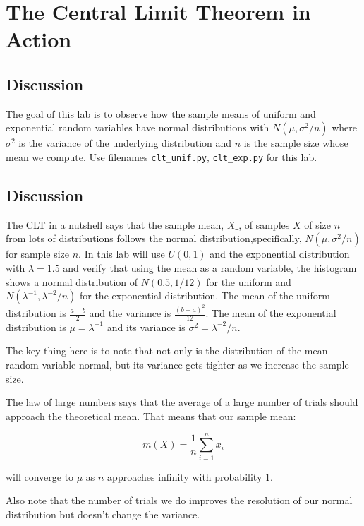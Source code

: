 \chapter{The Central Limit Theorem in Action}

\setcounter{problem}{1}

\section{Discussion}

\begin{fullwidth}

The goal of this lab is to observe how the sample means of uniform and exponential random variables have normal distributions with $N(\mu, \sigma^2/n)$ where $\sigma^2$ is the variance of the underlying distribution and $n$ is the sample size whose mean we compute. Use filenames {\tt clt\_unif.py}, {\tt clt\_exp.py} for this lab.

\section{Discussion}

The CLT in a nutshell says that the sample mean, $X\_$, of samples $X$ of size $n$
from lots of distributions follows the normal distribution,specifically, $N(\mu, \sigma^2/n)$ for sample size $n$.
 In this lab will use $U(0,1)$ and the exponential distribution with $\lambda=1.5$
and verify that using the mean as a random variable, the histogram shows a normal distribution of $N(0.5,1/12)$ for the uniform and $N(\lambda^{-1}, \lambda^{-2}/n)$ for the exponential distribution. The mean of the uniform distribution is $\frac{a+b}{2}$ and the variance is $\frac{(b-a)^2}{12}$. The mean of the exponential distribution is $\mu = \lambda^{-1}$ and its variance is $\sigma^2 = \lambda^{-2}/n$.

The key thing here is to note that not only is the distribution of the mean random variable normal, but its variance gets tighter as we increase the sample size. 

The law of large numbers says that the average of a large number of trials should approach the theoretical mean. That means that our sample mean:

\[
m(X) = \frac{1}{n} \sum_{i=1}^{n} x_i
\]

\noindent will converge to $\mu$ as $n$ approaches infinity with probability 1.

Also note that the number of trials we do improves the resolution of our normal distribution but doesn't change the variance.


\end{fullwidth}
